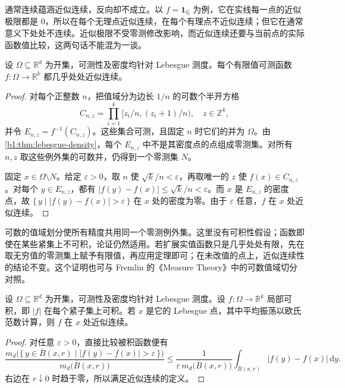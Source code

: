 通常连续蕴涵近似连续，反向却不成立。以 \(f=\mathbf1_{\mathbb Q}\) 为例，它在实线每一点的近似极限都是 \(0\)，所以在每个无理点近似连续，在每个有理点不近似连续；但它在通常意义下处处不连续。近似极限不受零测修改影响，而近似连续还要与当前点的实际函数值比较，这两句话不能混为一谈。

\begin{theorem}
\label{b1:thm:measurable-approximately-continuous}
设 \(\Omega\subseteq\mathbb R^d\) 为开集，可测性及密度均针对 Lebesgue 测度。每个有限值可测函数 \(f:\Omega\rightarrow\mathbb R^k\) 都几乎处处近似连续。
\end{theorem}
\begin{proof}
对每个正整数 \(n\)，把值域分为边长 \(1/n\) 的可数个半开方格
\[
C_{n,z}=\prod_{i=1}^k[z_i/n,(z_i+1)/n),
\quad z\in\mathbb Z^k,
\]
并令 \(E_{n,z}=f^{-1}(C_{n,z})\)。这些集合可测，且固定 \(n\) 时它们的并为 \(\Omega\)。由\cref{b1:thm:lebesgue-density}，每个 \(E_{n,z}\) 中不是其密度点的点组成零测集。对所有 \(n,z\) 取这些例外集的可数并，仍得到一个零测集 \(N\)。

固定 \(x\in\Omega\setminus N\)。给定 \(\varepsilon>0\)，取 \(n\) 使 \(\sqrt{k}/n<\varepsilon\)，再取唯一的 \(z\) 使 \(f(x)\in C_{n,z}\)。对每个 \(y\in E_{n,z}\)，都有 \(|f(y)-f(x)|\leq\sqrt{k}/n<\varepsilon\)。而 \(x\) 是 \(E_{n,z}\) 的密度点，故 \(\{\,y\mid |f(y)-f(x)|>\varepsilon\,\}\) 在 \(x\) 处的密度为零。由于 \(\varepsilon\) 任意，\(f\) 在 \(x\) 处近似连续。
\end{proof}

可数的值域划分使所有精度共用同一个零测例外集。这里没有可积性假设；函数即使在某些紧集上不可积，论证仍然适用。若扩展实值函数只是几乎处处有限，先在取无穷值的零测集上赋予有限值，再应用定理即可；在未改值的点上，近似连续性的结论不变。这个证明也可与 Fremlin 的《Measure Theory》\cite[261D]{Fremlin2016Measure}中的可数值域切分对照。

\begin{proposition}
\label{b1:prop:lebesgue-point-approximately-continuous}
设 \(\Omega\subseteq\mathbb R^d\) 为开集，可测性及密度均针对 Lebesgue 测度。设 \(f:\Omega\rightarrow\mathbb R^k\) 局部可积，即 \(|f|\) 在每个紧子集上可积。若 \(x\) 是它的 Lebesgue 点，其中平均振荡以欧氏范数计算，则 \(f\) 在 \(x\) 处近似连续。
\end{proposition}
\begin{proof}
对任意 \(\varepsilon>0\)，直接比较被积函数便有
\[
\frac{m_d\bigl(\{\,y\in\overline B(x,r)\mid |f(y)-f(x)|>\varepsilon\,\}\bigr)}
{m_d\bigl(\overline B(x,r)\bigr)}
\leq\frac{1}{\varepsilon\,m_d\bigl(\overline B(x,r)\bigr)}
\int_{\overline B(x,r)}|f(y)-f(x)|\,\mathrm dy.
\]
右边在 \(r\downarrow0\) 时趋于零，所以满足近似连续的定义。
\end{proof}

